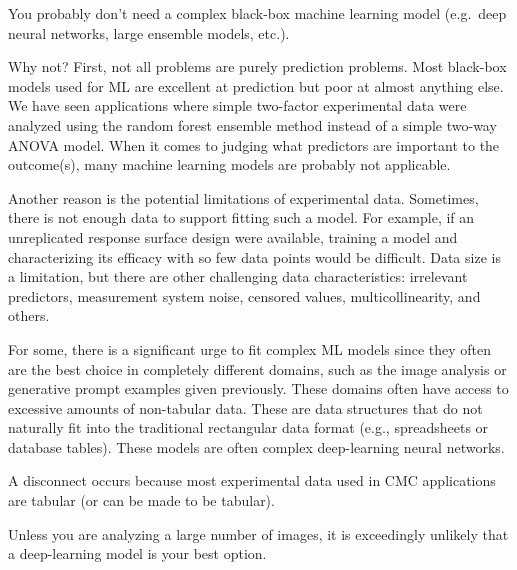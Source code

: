 \documentclass[
  letterpaper,
  DIV=11,
  numbers=noendperiod]{scrartcl}
\begin{document}
\begin{tcolorbox}[enhanced jigsaw, title=\textcolor{quarto-callout-important-color}{\faExclamation}\hspace{0.5em}{\textbf{WTF} \#2}, rightrule=.15mm, leftrule=.75mm, bottomtitle=1mm, opacityback=0, opacitybacktitle=0.6, bottomrule=.15mm, arc=.35mm, colframe=quarto-callout-important-color-frame, breakable, toprule=.15mm, toptitle=1mm, colback=white, titlerule=0mm, coltitle=black, left=2mm, colbacktitle=quarto-callout-important-color!10!white]

You probably don't need a complex black-box machine learning model
(e.g.~deep neural networks, large ensemble models, etc.).

\end{tcolorbox}

Why not? First, not all problems are purely prediction problems. Most
black-box models used for ML are excellent at prediction but poor at
almost anything else. We have seen applications where simple two-factor
experimental data were analyzed using the random forest ensemble method
instead of a simple two-way ANOVA model. When it comes to judging what
predictors are important to the outcome(s), many machine learning models
are probably not applicable.

Another reason is the potential limitations of experimental data.
Sometimes, there is not enough data to support fitting such a model. For
example, if an unreplicated response surface design were available,
training a model and characterizing its efficacy with so few data points
would be difficult. Data size is a limitation, but there are other
challenging data characteristics: irrelevant predictors, measurement
system noise, censored values, multicollinearity, and others.

For some, there is a significant urge to fit complex ML models since
they often are the best choice in completely different domains, such as
the image analysis or generative prompt examples given previously. These
domains often have access to excessive amounts of non-tabular data.
These are data structures that do not naturally fit into the traditional
rectangular data format (e.g., spreadsheets or database tables). These
models are often complex deep-learning neural networks.

A disconnect occurs because most experimental data used in CMC
applications are tabular (or can be made to be tabular).

\begin{tcolorbox}[enhanced jigsaw, title=\textcolor{quarto-callout-important-color}{\faExclamation}\hspace{0.5em}{\textbf{WTF} \#3}, rightrule=.15mm, leftrule=.75mm, bottomtitle=1mm, opacityback=0, opacitybacktitle=0.6, bottomrule=.15mm, arc=.35mm, colframe=quarto-callout-important-color-frame, breakable, toprule=.15mm, toptitle=1mm, colback=white, titlerule=0mm, coltitle=black, left=2mm, colbacktitle=quarto-callout-important-color!10!white]

Unless you are analyzing a large number of images, it is exceedingly
unlikely that a deep-learning model is your best option.

\end{tcolorbox}
\end{document}
